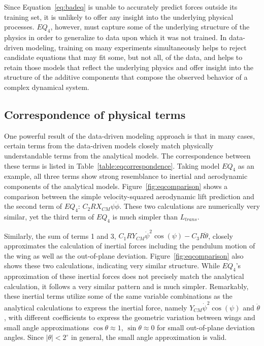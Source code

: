 \documentclass[fleqn,10pt]{wlscirep}
\begin{document}
Since Equation~\eqref{eq:badeq} is unable to accurately predict forces outside its training set, it is unlikely to offer any insight into the underlying physical processes.  $EQ_4$, however, must capture some of the underlying structure of the physics in order to generalize to data upon which it was not trained.  In data-driven modeling, training on many experiments simultaneously helps to reject candidate equations that may fit some, but not all, of the data, and helps to retain those models that reflect the underlying physics and offer insight into the structure of the additive components that compose the observed behavior of a complex dynamical system.

\subsection{Correspondence of physical terms}
One powerful result of the data-driven modeling approach is that in many cases, certain terms from the data-driven models closely match physically understandable terms from the analytical models.  The correspondence between these terms is listed in Table~\ref{table:eqcorrespondence}. Taking model $EQ_4$ as an example, all three terms show strong resemblance to inertial and aerodynamic components of the analytical models.  Figure~\ref{fig:eqcomparison} shows a comparison between the simple velocity-squared aerodynamic lift prediction and the second term of $EQ_4$: \(C_2RX_{CM}\psi\dot{\phi}\).  These two calculations are numerically very similar, yet the third term of $EQ_4$ is much simpler than $L_{trans}$.

Similarly, the sum of terms 1 and 3, \(C_1RY_{CM}\dot{\psi}^2\cos(\psi) - C_3R\ddot{\theta}\), closely approximates the calculation of inertial forces including the pendulum motion of the wing as well as the out-of-plane deviation.  Figure~\ref{fig:eqcomparison} also shows these two calculations, indicating very similar structure.  While $EQ_4$'s approximation of these inertial forces does not precisely match the analytical calculation, it follows a very similar pattern and is much simpler.  Remarkably, these inertial terms utilize some of the same variable combinations as the analytical calculations to express the inertial force, namely \(Y_{CM}\dot{\psi}^2\cos(\psi)\) and \(\ddot{\theta}\), with different coefficients to express the geometric variation between wings and small angle approximations \(\cos\theta\approx1\), \(\sin\theta\approx0\) for small out-of-plane deviation angles.  Since \(|\theta|<2^{\circ}\) in general, the small angle approximation is valid.
\end{document}
